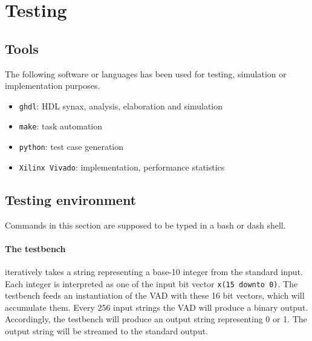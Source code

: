 \section{Testing}

\subsection{Tools}
The following software or languages has been used for testing, simulation or
implementation purposes.

\begin{itemize}
  \item \texttt{ghdl}: HDL synax, analysis, elaboration and simulation
  \item \texttt{make}: task automation
  \item \texttt{python}: test case generation
  \item \texttt{Xilinx Vivado}: implementation, performance statistics
\end{itemize}

\subsection{Testing environment}

Commands in this section are supposed to be typed in a bash or dash shell.

\paragraph{The testbench} iteratively takes a string representing a base-10
integer from the standard input. Each integer is interpreted
as one of the input bit vector \texttt{x(15 downto 0)}. The testbench feeds an
instantiation of the VAD with these 16 bit vectors, which will accumulate them.
Every 256 input strings the VAD will produce a binary output. Accordingly,
the testbench will produce an output string representing 0 or 1. The output
string will be streamed to the standard output.

